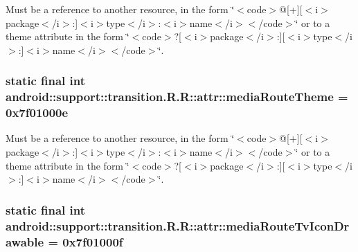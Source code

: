Must be a reference to another resource, in the form \char`\"{}$<$code$>$@\mbox{[}+\mbox{]}\mbox{[}$<$i$>$package$<$/i$>$:\mbox{]}$<$i$>$type$<$/i$>$:$<$i$>$name$<$/i$>$$<$/code$>$\char`\"{} or to a theme attribute in the form \char`\"{}$<$code$>$?\mbox{[}$<$i$>$package$<$/i$>$:\mbox{]}\mbox{[}$<$i$>$type$<$/i$>$:\mbox{]}$<$i$>$name$<$/i$>$$<$/code$>$\char`\"{}. \hypertarget{classandroid_1_1support_1_1transition_1_1_r_1_1attr_55f05a4909d5d55f697202e479d57b68}{
\subsubsection[{mediaRouteTheme}]{\setlength{\rightskip}{0pt plus 5cm}static final int android::support::transition.R.R::attr::mediaRouteTheme = 0x7f01000e}}
\label{classandroid_1_1support_1_1transition_1_1_r_1_1attr_55f05a4909d5d55f697202e479d57b68}


Must be a reference to another resource, in the form \char`\"{}$<$code$>$@\mbox{[}+\mbox{]}\mbox{[}$<$i$>$package$<$/i$>$:\mbox{]}$<$i$>$type$<$/i$>$:$<$i$>$name$<$/i$>$$<$/code$>$\char`\"{} or to a theme attribute in the form \char`\"{}$<$code$>$?\mbox{[}$<$i$>$package$<$/i$>$:\mbox{]}\mbox{[}$<$i$>$type$<$/i$>$:\mbox{]}$<$i$>$name$<$/i$>$$<$/code$>$\char`\"{}. \hypertarget{classandroid_1_1support_1_1transition_1_1_r_1_1attr_a6d82279f6fc966ddaed97617fe3d02e}{
\subsubsection[{mediaRouteTvIconDrawable}]{\setlength{\rightskip}{0pt plus 5cm}static final int android::support::transition.R.R::attr::mediaRouteTvIconDrawable = 0x7f01000f}}
\label{classandroid_1_1support_1_1transition_1_1_r_1_1attr_a6d82279f6fc966ddaed97617fe3d02e}


